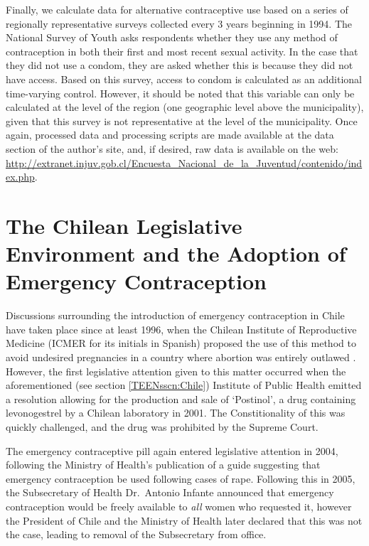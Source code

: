 \documentclass[11pt,subeqn]{article}
\begin{document}
\begin{spacing}{1.4}
Finally, we calculate data for alternative contraceptive use based on
a series of regionally representative surveys collected every 3 years beginning
in 1994.  The National Survey of Youth asks respondents whether they use any 
method of contraception in both their first and most recent sexual activity.  
In the case that they did not use a condom, they are asked whether this is 
because they did not have access.  Based on this survey, access to condom is
calculated as an additional time-varying control.  However, it should be noted
that this variable can only be calculated at the level of the region (one
geographic level above the municipality), given that this survey is not
representative at the level of the municipality.  Once again, processed data and
processing scripts are made available at the data section of the author's site,
and, if desired, raw data is available on the web: 
\url{http://extranet.injuv.gob.cl/Encuesta_Nacional_de_la_Juventud/contenido/index.php}.

\clearpage
\section[Additional Details of the Emergency Contraceptive Reform]{The Chilean 
Legislative Environment and the Adoption of Emergency Contraception}
\label{TEENscn:applegislate}
Discussions surrounding the introduction of emergency contraception in Chile
have taken place since at least 1996, when the Chilean Institute of 
Reproductive Medicine (ICMER for its initials in Spanish) proposed the use of
this method to avoid undesired pregnancies in a country where abortion was
entirely outlawed \citep{Dides2009}.  However, the first legislative attention
given to this matter occurred when the aforementioned (see section 
\ref{TEENsscn:Chile}) Institute of Public Health emitted a resolution allowing
for the production and sale of `Postinol', a drug containing levonogestrel by a
Chilean laboratory in 2001.  The Constitionality of this was quickly 
challenged, and the drug was prohibited by the Supreme Court.

The emergency contraceptive pill again entered legislative attention in 2004,
following the Ministry of Health's publication of a guide suggesting that 
emergency contraception be used following cases of rape.  Following this in 
2005, the Subsecretary of Health Dr.\ Antonio Infante announced that emergency
contraception would be freely available to \emph{all} women who requested it,
however the President of Chile and the Ministry of Health later declared that
this was not the case, leading to removal of the Subsecretary from office.


\end{spacing}
\end{document}
